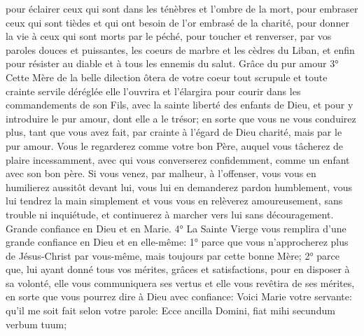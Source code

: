 pour éclairer ceux qui sont dans les ténèbres et l'ombre de la mort, pour embraser ceux qui sont tièdes et qui ont
besoin de l'or embrasé de la charité, pour donner la vie à ceux qui sont morts par le péché, pour toucher et
renverser, par vos paroles douces et puissantes, les coeurs de marbre et les cèdres du Liban, et enfin pour
résister au diable et à tous les ennemis du salut.
Grâce du pur amour
 3° Cette Mère de la belle dilection ôtera de votre coeur tout scrupule et toute crainte servile déréglée elle
l'ouvrira et l'élargira pour courir dans les commandements de son Fils, avec la sainte liberté des enfants de Dieu,
et pour y introduire le pur amour, dont elle a le trésor; en sorte que vous ne vous conduirez plus, tant que vous
avez fait, par crainte à l'égard de Dieu charité, mais par le pur amour. Vous le regarderez comme votre bon Père,
auquel vous tâcherez de plaire incessamment, avec qui vous converserez confidemment, comme un enfant avec
son bon père. Si vous venez, par malheur, à l'offenser, vous vous en humilierez aussitôt devant lui, vous lui en
demanderez pardon humblement, vous lui tendrez la main simplement et vous vous en relèverez amoureusement,
sans trouble ni inquiétude, et continuerez à marcher vers lui sans découragement.
Grande confiance en Dieu et en Marie.
 4° La Sainte Vierge vous remplira d'une grande confiance en Dieu et en elle-même:
1° parce que vous n'approcherez plus de Jésus-Christ par vous-même, mais toujours par cette bonne Mère;
2° parce que, lui ayant donné tous vos mérites, grâces et satisfactions, pour en disposer à sa volonté, elle vous communiquera ses vertus et elle vous revêtira de ses mérites, en sorte que vous pourrez dire à Dieu avec confiance: Voici Marie votre servante: qu'il me soit fait selon votre parole: Ecce ancilla Domini, fiat mihi secundum verbum tuum;
